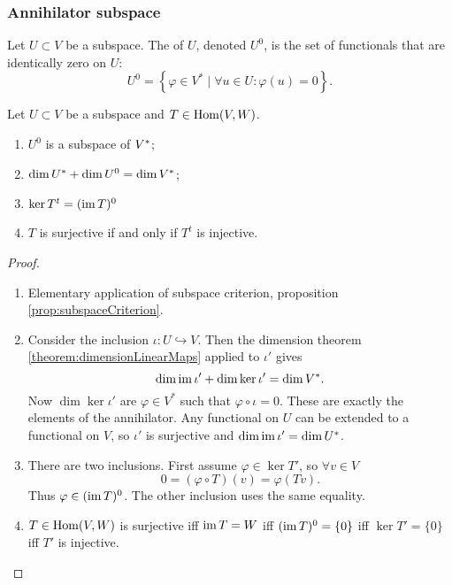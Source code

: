 \subsubsection{Annihilator subspace}
\begin{definition}
Let $U\subset V$ be a subspace. The  of $U$, denoted $U^0$, is the set of functionals that are identically zero on $U$:
\[ U^0 = \left\{ \varphi\in V^*\;|\; \forall u\in U:\varphi(u) = 0 \right\}. \]
\end{definition}
\begin{proposition} \label{prop:annihilatorSpace}
Let $U\subset V$ be a subspace and $T\in \operatorname{Hom}(V,W)$.
\begin{enumerate}
\item $U^0$ is a subspace of ${V}^*$;
\item $\dim {U}^* + \dim U^0 = \dim {V}^*$;
\item $\ker T^t = (\operatorname{im} T)^0$
\item $T$ is surjective \textup{if and only if} $T^t$ is injective.
\end{enumerate}
\end{proposition}
\begin{proof}
\mbox{}
\begin{enumerate}
\item Elementary application of subspace criterion, proposition \ref{prop:subspaceCriterion}.
\item Consider the inclusion $\iota: U\hookrightarrow V$. Then the dimension theorem \ref{theorem:dimensionLinearMaps} applied to $\iota'$ gives
\[ \dim \operatorname{im} \iota' + \dim \ker\iota' = \dim V^*. \]
Now $\dim \ker\iota'$ are $\varphi\in V^*$ such that $\varphi \circ \iota = 0$. These are exactly the elements of the annihilator. Any functional on $U$ can be extended to a functional on $V$, so $\iota'$ is surjective and $\dim \operatorname{im} \iota' = \dim U^*$.
\item There are two inclusions. First assume $\varphi \in \ker T'$, so $\forall v\in V$
\[ 0 = (\varphi\circ T)(v) = \varphi(Tv). \]
Thus $\varphi\in(\operatorname{im} T)^0$. The other inclusion uses the same equality.
\item $T\in\operatorname{Hom}(V,W)$ is surjective iff $\operatorname{im} T = W$ iff $(\operatorname{im} T)^0 = \{0\}$ iff $\ker T' = \{0\}$ iff $T'$ is injective.
\end{enumerate}
\end{proof}


